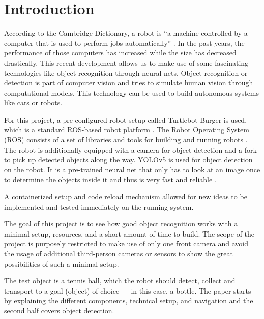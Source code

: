\section{Introduction}

According to the Cambridge Dictionary, a robot is \enquote{a machine controlled by a computer that is used to perform jobs automatically} \autocite{dict-cambridge}. In the past years, the performance of those computers has increased while the size has decreased drastically. This recent development allows us to make use of some fascinating technologies like object recognition through neural nets. Object recognition or detection is part of computer vision and tries to simulate human vision through computational models. This technology can be used to build autonomous systems like cars or robots.

For this project, a pre-configured robot setup called Turtlebot Burger is used, which is a standard ROS-based robot platform \autocite{emanual-turtlebot3-ov}. The Robot Operating System (ROS) consists of a set of libraries and tools for building and running robots \autocite{ros-technical-overview}. The robot is additionally equipped with a camera for object detection and a fork to pick up detected objects along the way. YOLOv5 is used for object detection on the robot. It is a pre-trained neural net that only has to look at an image once to determine the objects inside it and thus is very fast and reliable \autocite{ultralytics}.

A containerized setup and code reload mechanism allowed for new ideas to be implemented and tested immediately on the running system.

The goal of this project is to see how good object recognition works with a minimal setup, resources, and a short amount of time to build. The scope of the project is purposely restricted to make use of only one front camera and avoid the usage of additional third-person cameras or sensors to show the great possibilities of such a minimal setup.

The test object is a tennis ball, which the robot should detect, collect and transport to a goal (object) of choice --- in this case, a bottle. The paper starts by explaining the different components, technical setup, and navigation and the second half covers object detection.
